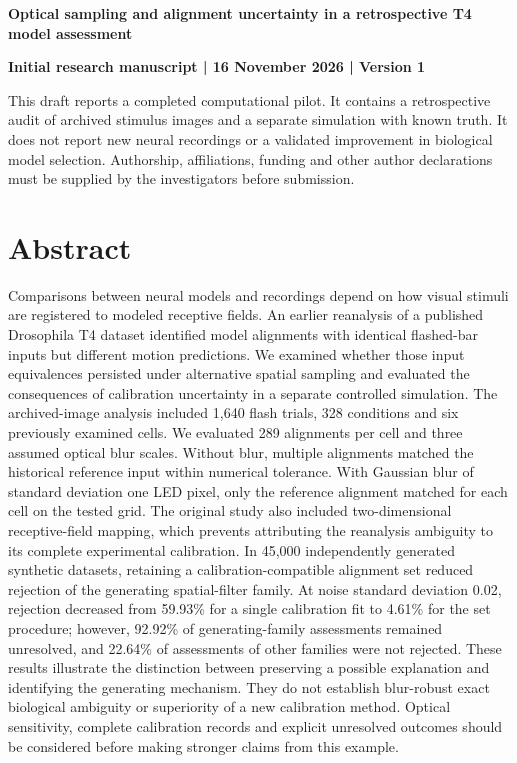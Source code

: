 \documentclass[11pt,letterpaper]{article}
\begin{document}
\begin{center}
{\Large\bfseries Optical sampling and alignment uncertainty in a retrospective T4 model assessment}
\end{center}
\textbf{Initial research manuscript | 16 November 2026 | Version 1}


This draft reports a completed computational pilot. It contains a retrospective audit of archived stimulus images and a separate simulation with known truth. It does not report new neural recordings or a validated improvement in biological model selection. Authorship, affiliations, funding and other author declarations must be supplied by the investigators before submission.


\section{Abstract}

Comparisons between neural models and recordings depend on how visual stimuli are registered to modeled receptive fields. An earlier reanalysis of a published Drosophila T4 dataset identified model alignments with identical flashed-bar inputs but different motion predictions. We examined whether those input equivalences persisted under alternative spatial sampling and evaluated the consequences of calibration uncertainty in a separate controlled simulation. The archived-image analysis included 1,640 flash trials, 328 conditions and six previously examined cells. We evaluated 289 alignments per cell and three assumed optical blur scales. Without blur, multiple alignments matched the historical reference input within numerical tolerance. With Gaussian blur of standard deviation one LED pixel, only the reference alignment matched for each cell on the tested grid. The original study also included two-dimensional receptive-field mapping, which prevents attributing the reanalysis ambiguity to its complete experimental calibration. In 45,000 independently generated synthetic datasets, retaining a calibration-compatible alignment set reduced rejection of the generating spatial-filter family. At noise standard deviation 0.02, rejection decreased from 59.93\% for a single calibration fit to 4.61\% for the set procedure; however, 92.92\% of generating-family assessments remained unresolved, and 22.64\% of assessments of other families were not rejected. These results illustrate the distinction between preserving a possible explanation and identifying the generating mechanism. They do not establish blur-robust exact biological ambiguity or superiority of a new calibration method. Optical sensitivity, complete calibration records and explicit unresolved outcomes should be considered before making stronger claims from this example.
\end{document}
